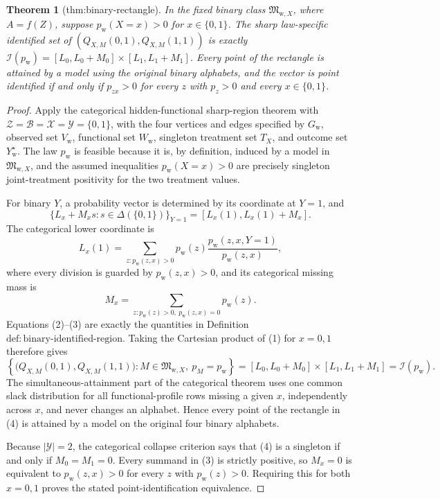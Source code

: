\documentclass{article}
\newtheorem{theorem}{Theorem}
\begin{document}
\begin{theorem}[thm:binary-rectangle]\label{thm:binary-rectangle}
In the fixed binary class \(\mathfrak M_{\mathrm w,X}\), where \(A=f(Z)\), suppose \(p_{\mathrm w}(X=x)>0\) for \(x\in\{0,1\}\). The sharp law-specific identified set of \((Q_{X,M}(0,1),Q_{X,M}(1,1))\) is exactly \(\mathcal I(p_{\mathrm w})=[L_0,L_0+M_0]\times[L_1,L_1+M_1]\). Every point of the rectangle is attained by a model using the original binary alphabets, and the vector is point identified if and only if \(p_{zx}>0\) for every \(z\) with \(p_z>0\) and every \(x\in\{0,1\}\).
\end{theorem}
\begin{proof}
Apply the categorical hidden-functional sharp-region theorem with
\(\mathcal Z=\mathcal B=\mathcal X=\mathcal Y=\{0,1\}\), with the four
vertices and edges specified by \(G_{\mathrm w}\), observed set
\(V_{\mathrm w}\), functional set \(W_{\mathrm w}\), singleton treatment
set \(T_X\), and outcome set \(Y_{\mathrm w}^{\star}\).  The law
\(p_{\mathrm w}\) is feasible because it is, by definition, induced by a
model in \(\mathfrak M_{\mathrm w,X}\), and the assumed inequalities
\(p_{\mathrm w}(X=x)>0\) are precisely singleton joint-treatment
positivity for the two treatment values.

For binary \(Y\), a probability vector is determined by its coordinate at
\(Y=1\), and
\[
 \{L_x+M_xs:s\in\Delta(\{0,1\})\}_{Y=1}
 =[L_x(1),L_x(1)+M_x].
\tag{1}
\]
The categorical lower coordinate is
\[
 L_x(1)
 =\sum_{z:p_{\mathrm w}(z,x)>0}
 p_{\mathrm w}(z)\frac{p_{\mathrm w}(z,x,Y=1)}{p_{\mathrm w}(z,x)},
\tag{2}
\]
where every division is guarded by \(p_{\mathrm w}(z,x)>0\), and its
categorical missing mass is
\[
 M_x=\sum_{z:p_{\mathrm w}(z)>0,\ p_{\mathrm w}(z,x)=0}
 p_{\mathrm w}(z).
\tag{3}
\]
Equations (2)--(3) are exactly the quantities in
Definition~\(\mathrm{def:binary\text{-}identified\text{-}region}\).
Taking the Cartesian product of (1) for \(x=0,1\) therefore gives
\[
 \left\{\bigl(Q_{X,M}(0,1),Q_{X,M}(1,1)\bigr):
 M\in\mathfrak M_{\mathrm w,X},\ p_M=p_{\mathrm w}\right\}
 =[L_0,L_0+M_0]\times[L_1,L_1+M_1]
 =\mathcal I(p_{\mathrm w}).
\tag{4}
\]
The simultaneous-attainment part of the categorical theorem uses one
common slack distribution for all functional-profile rows missing a given
\(x\), independently across \(x\), and never changes an alphabet.  Hence
every point of the rectangle in (4) is attained by a model on the original
four binary alphabets.

Because \(\lvert\mathcal Y\rvert=2\), the categorical collapse criterion
says that (4) is a singleton if and only if \(M_0=M_1=0\).  Every summand
in (3) is strictly positive, so \(M_x=0\) is equivalent to
\(p_{\mathrm w}(z,x)>0\) for every \(z\) with
\(p_{\mathrm w}(z)>0\).  Requiring this for both \(x=0,1\) proves the
stated point-identification equivalence.
\end{proof}
\end{document}
